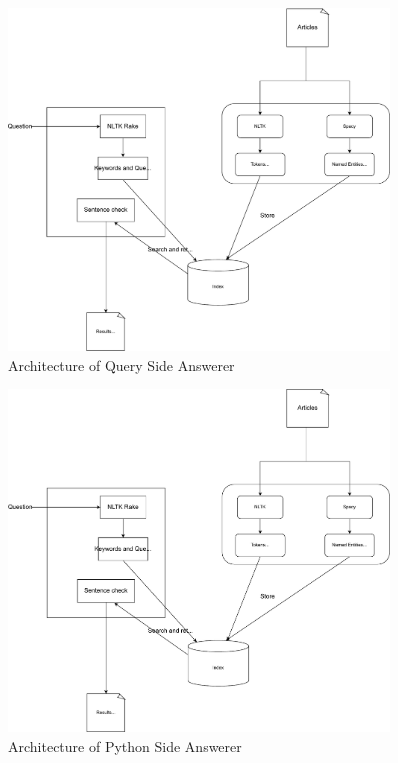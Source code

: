 \documentclass[11pt]{article}
\begin{document}
  \begin{figure}[H]
    \centering
    \includegraphics[width=0.9\textwidth]{fig/query.pdf}
    \caption{Architecture of Query Side Answerer}
    \label{fig:query}
  \end{figure}

  \begin{figure}[H]
    \centering
    \includegraphics[width=0.9\textwidth]{fig/python.pdf}
    \caption{Architecture of Python Side Answerer}
    \label{fig:python}
  \end{figure}
\end{document}
